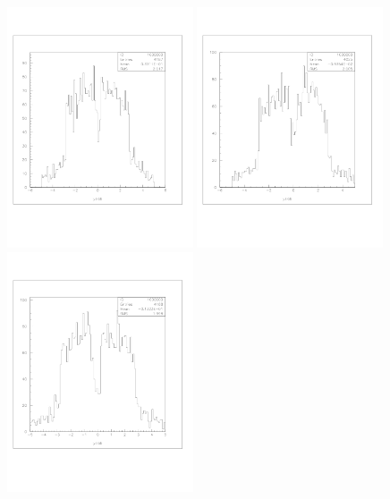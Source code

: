 \documentclass[a4paper]{article}
\begin{document}
\begin{figure}[!htb]
  \centering
  \includegraphics[width=0.49\textwidth]{ex_images/2_cut_04.jpg}
  \includegraphics[width=0.49\textwidth]{ex_images/2_cut_06.jpg}\\
  \includegraphics[width=0.49\textwidth]{ex_images/2_cut_08.jpg}

\end{figure}
\end{document}
